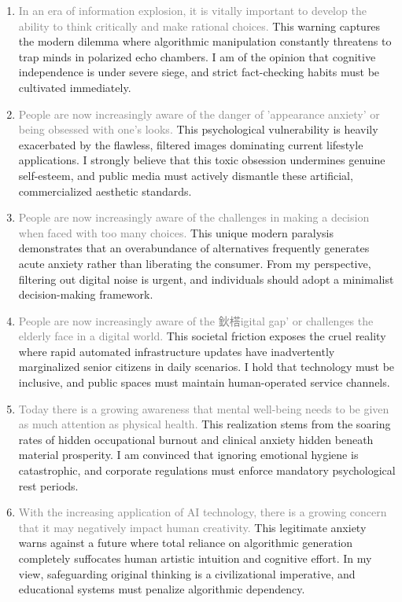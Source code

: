 ﻿\documentclass[lang=cn,11pt]{elegantbook}
\begin{document}
\begin{enumerate}
    \item \textcolor{gray}{In an era of information explosion, it is vitally important to develop the ability to think critically and make rational choices.} This warning captures the modern dilemma where algorithmic manipulation constantly threatens to trap minds in polarized echo chambers. I am of the opinion that cognitive independence is under severe siege, and strict fact-checking habits must be cultivated immediately.
    \item \textcolor{gray}{People are now increasingly aware of the danger of 'appearance anxiety' or being obsessed with one's looks.} This psychological vulnerability is heavily exacerbated by the flawless, filtered images dominating current lifestyle applications. I strongly believe that this toxic obsession undermines genuine self-esteem, and public media must actively dismantle these artificial, commercialized aesthetic standards.
    \item \textcolor{gray}{People are now increasingly aware of the challenges in making a decision when faced with too many choices.} This unique modern paralysis demonstrates that an overabundance of alternatives frequently generates acute anxiety rather than liberating the consumer. From my perspective, filtering out digital noise is urgent, and individuals should adopt a minimalist decision-making framework.
    \item \textcolor{gray}{People are now increasingly aware of the 鈥榙igital gap' or challenges the elderly face in a digital world. }This societal friction exposes the cruel reality where rapid automated infrastructure updates have inadvertently marginalized senior citizens in daily scenarios. I hold that technology must be inclusive, and public spaces must maintain human-operated service channels.
    \item \textcolor{gray}{Today there is a growing awareness that mental well-being needs to be given as much attention as physical health.} This realization stems from the soaring rates of hidden occupational burnout and clinical anxiety hidden beneath material prosperity. I am convinced that ignoring emotional hygiene is catastrophic, and corporate regulations must enforce mandatory psychological rest periods.
    \item \textcolor{gray}{With the increasing application of AI technology, there is a growing concern that it may negatively impact human creativity.} This legitimate anxiety warns against a future where total reliance on algorithmic generation completely suffocates human artistic intuition and cognitive effort. In my view, safeguarding original thinking is a civilizational imperative, and educational systems must penalize algorithmic dependency.

\end{enumerate}
\end{document}
